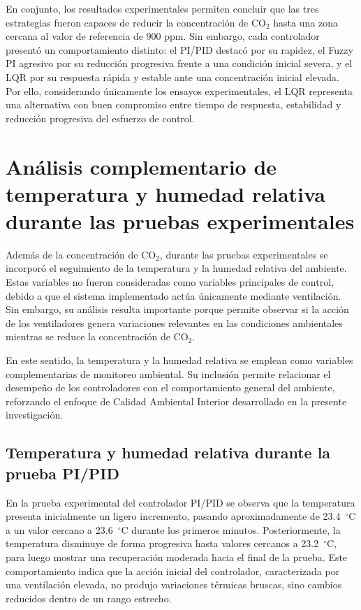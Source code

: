 En conjunto, los resultados experimentales permiten concluir que las tres estrategias fueron capaces de reducir la concentración de CO\(_2\) hasta una zona cercana al valor de referencia de 900 ppm. Sin embargo, cada controlador presentó un comportamiento distinto: el PI/PID destacó por su rapidez, el Fuzzy PI agresivo por su reducción progresiva frente a una condición inicial severa, y el LQR por su respuesta rápida y estable ante una concentración inicial elevada. Por ello, considerando únicamente los ensayos experimentales, el LQR representa una alternativa con buen compromiso entre tiempo de respuesta, estabilidad y reducción progresiva del esfuerzo de control.

\section{Análisis complementario de temperatura y humedad relativa durante las pruebas experimentales}

Además de la concentración de CO\(_2\), durante las pruebas experimentales se incorporó el seguimiento de la temperatura y la humedad relativa del ambiente. Estas variables no fueron consideradas como variables principales de control, debido a que el sistema implementado actúa únicamente mediante ventilación. Sin embargo, su análisis resulta importante porque permite observar si la acción de los ventiladores genera variaciones relevantes en las condiciones ambientales mientras se reduce la concentración de CO\(_2\).

En este sentido, la temperatura y la humedad relativa se emplean como variables complementarias de monitoreo ambiental. Su inclusión permite relacionar el desempeño de los controladores con el comportamiento general del ambiente, reforzando el enfoque de Calidad Ambiental Interior desarrollado en la presente investigación.

\subsection{Temperatura y humedad relativa durante la prueba PI/PID}

En la prueba experimental del controlador PI/PID se observa que la temperatura presenta inicialmente un ligero incremento, pasando aproximadamente de 23.4~\(^\circ\)C a un valor cercano a 23.6~\(^\circ\)C durante los primeros minutos. Posteriormente, la temperatura disminuye de forma progresiva hasta valores cercanos a 23.2~\(^\circ\)C, para luego mostrar una recuperación moderada hacia el final de la prueba. Este comportamiento indica que la acción inicial del controlador, caracterizada por una ventilación elevada, no produjo variaciones térmicas bruscas, sino cambios reducidos dentro de un rango estrecho.

